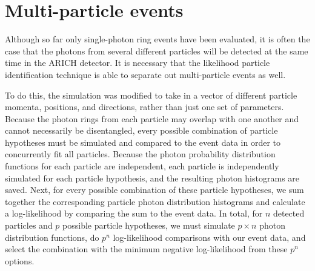 \begin{figure}[]
\centering
{}
\caption[\TODO{}]{}
\label{fig:angleSeps}
\end{figure}

\section{Multi-particle events}
Although so far only single-photon ring events have been evaluated, it is often the case that the photons from several different particles will be detected at the same time in the ARICH detector.
It is necessary that the likelihood particle identification technique is able to separate out multi-particle events as well. 

To do this, the simulation was modified to take in a vector of different particle momenta, positions, and directions, rather than just one set of parameters.
Because the photon rings from each particle may overlap with one another and cannot necessarily be disentangled, every possible combination of particle hypotheses must be simulated and compared to the event data in order to concurrently fit all particles.
Because the photon probability distribution functions for each particle are independent, each particle is independently simulated for each particle hypothesis, and the resulting photon histograms are saved.
Next, for every possible combination of these particle hypotheses, we sum together the corresponding particle photon distribution histograms and calculate a log-likelihood by comparing the sum to the event data.
In total, for $n$ detected particles and $p$ possible particle hypotheses, we must simulate $p \times n$ photon distribution functions, do $p^n$  log-likelihood comparisons with our event data, and select the combination with the minimum negative log-likelihood from these $p^n$ options. 

